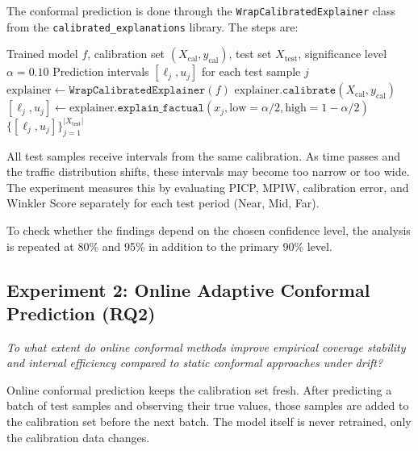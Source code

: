 \documentclass[12pt, a4paper, oneside]{report}
\begin{document}
The conformal prediction is done through the \texttt{WrapCalibratedExplainer} class from the \texttt{calibrated\_explanations} library. The steps are:

\begin{algorithm}[H]
\caption{Static Conformal Prediction via \texttt{calibrated\_explanations}}
\label{alg:static_cp}
\begin{algorithmic}[1]
\REQUIRE Trained model $f$, calibration set $(X_{\text{cal}}, y_{\text{cal}})$, test set $X_{\text{test}}$, significance level $\alpha = 0.10$
\ENSURE Prediction intervals $[\ell_j, u_j]$ for each test sample $j$
\STATE $\text{explainer} \leftarrow \texttt{WrapCalibratedExplainer}(f)$ 
\STATE $\text{explainer}.\texttt{calibrate}(X_{\text{cal}}, y_{\text{cal}})$ 
    \STATE $[\ell_j, u_j] \leftarrow \text{explainer}.\texttt{explain\_factual}(x_j, \text{low}=\alpha/2, \text{high}=1-\alpha/2)$
\ENDFOR
\RETURN $\{[\ell_j, u_j]\}_{j=1}^{|X_{\text{test}}|}$
\end{algorithmic}
\end{algorithm}

All test samples receive intervals from the same calibration. As time passes and the traffic distribution shifts, these intervals may become too narrow or too wide. The experiment measures this by evaluating PICP, MPIW, calibration error, and Winkler Score separately for each test period (Near, Mid, Far).

To check whether the findings depend on the chosen confidence level, the analysis is repeated at 80\% and 95\% in addition to the primary 90\% level.

\subsection{Experiment 2: Online Adaptive Conformal Prediction (RQ2)}
\label{subsec:exp2_method}

\emph{To what extent do online conformal methods improve empirical coverage stability and interval efficiency compared to static conformal approaches under drift?}

Online conformal prediction keeps the calibration set fresh. After predicting a batch of test samples and observing their true values, those samples are added to the calibration set before the next batch. The model itself is never retrained, only the calibration data changes.
\end{document}
